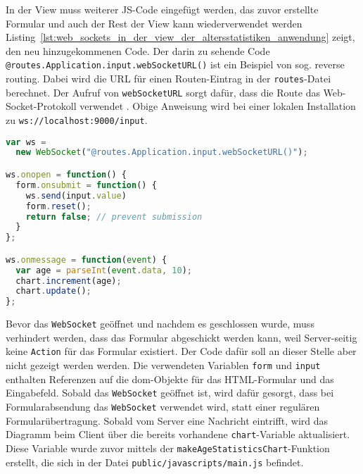 In der View muss weiterer JS-Code eingefügt werden, das zuvor erstellte Formular und auch der Rest der View kann wiederverwendet werden
Listing~\ref{lst:web_sockets_in_der_view_der_altersstatistiken_anwendung} zeigt, den neu hinzugekommenen Code.
Der darin zu sehende Code \lstinline|@routes.Application.input.webSocketURL()| ist ein Beispiel von sog. reverse routing.
Dabei wird die URL für einen Routen-Eintrag in der \lstinline|routes|-Datei berechnet.
Der Aufruf von \lstinline|webSocketURL| sorgt dafür, dass die Route das Web-Socket-Protokoll verwendet \cite[vgl.][S.~117, 355]{play_for_scala_v8}.
Obige Anweisung wird bei einer lokalen Installation zu \lstinline[language=sh]|ws://localhost:9000/input|.

\begin{lstlisting}[language=javascript, caption=Web-Sockets in der View der Altersstatistiken-Anwendung, label=lst:web_sockets_in_der_view_der_altersstatistiken_anwendung]
var ws =
  new WebSocket("@routes.Application.input.webSocketURL()");

ws.onopen = function() {
  form.onsubmit = function() {
    ws.send(input.value)
    form.reset();
    return false; // prevent submission
  }
};

ws.onmessage = function(event) {
  var age = parseInt(event.data, 10);
  chart.increment(age);
  chart.update();
};
\end{lstlisting}

Bevor das \lstinline|WebSocket| geöffnet und nachdem es geschlossen wurde, muss verhindert werden, dass das Formular abgeschickt werden kann, weil Server-seitig keine \lstinline|Action| für das Formular existiert.
Der Code dafür soll an dieser Stelle aber nicht gezeigt werden werden.
Die verwendeten Variablen \lstinline|form| und \lstinline|input| enthalten Referenzen auf die \gls{dom}-Objekte für das HTML-Formular und das Eingabefeld.
Sobald das \lstinline|WebSocket| geöffnet ist, wird dafür gesorgt, dass bei Formularabsendung das \lstinline|WebSocket| verwendet wird, statt einer regulären Formularübertragung.
Sobald vom Server eine Nachricht eintrifft, wird das Diagramm beim Client über die bereits vorhandene \lstinline|chart|-Variable aktualisiert.
Diese Variable wurde zuvor mittels der \lstinline|makeAgeStatisticsChart|-Funktion erstellt, die sich in der Datei \lstinline|public/javascripts/main.js| befindet.



